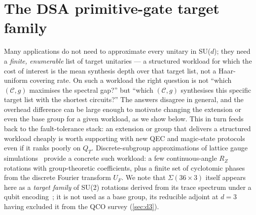 \documentclass[twocolumn,superscriptaddress,showpacs,nofootinbib,notitlepage,preprintnumbers,secnumarabic,amssymb, nobibnotes, aps, prd]{revtex4-2}
\newcommand{\QT}{Q_{T}}              %
\newcommand{\Sigmathree}[1]{\Sigma(#1\!\times\!3)} %
\begin{document}
\section{The DSA primitive-gate target family}\label{sec:lamm}

Many applications do not need to approximate every unitary in SU($d$); they need a \emph{finite, enumerable} list of target unitaries --- a structured workload for which the cost of interest is the mean synthesis depth over that target list, not a Haar-uniform covering rate. On such a workload the right question is not ``which $(\mathcal{C},g)$ maximises the spectral gap?'' but ``which $(\mathcal{C},g)$ synthesises this specific target list with the shortest circuits?'' The answers disagree in general, and the overhead difference can be large enough to motivate changing the extension or even the base group for a given workload, as we show below. This in turn feeds back to the fault-tolerance stack: an extension or group that delivers a structured workload cheaply is worth supporting with new QEC and magic-state protocols even if it ranks poorly on $\QT$. Discrete-subgroup approximations of lattice gauge simulations~\cite{Lamm:2019bik,Alam:2021uuq,Gustafson:2022xdt} provide a concrete such workload: a few continuous-angle $R_Z$ rotations with group-theoretic coefficients, plus a finite set of cyclotomic phases from the discrete Fourier transform $U_F$. We note that $\Sigmathree{36}$ itself appears here as a \emph{target family} of SU(2) rotations derived from its trace spectrum under a qubit encoding~\cite{GustafsonJi:2024sig}; it is not used as a base group, its reducible adjoint at $d=3$ having excluded it from the QCO survey (\cref{sec:d3}).
\end{document}
